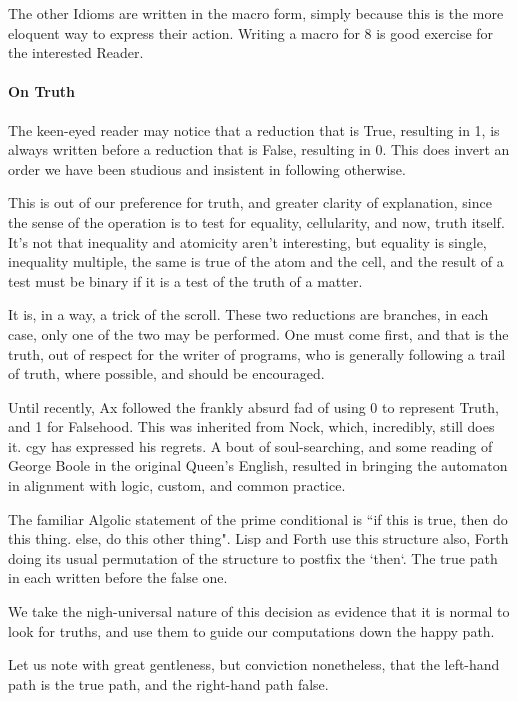 \documentclass[twoside]{article}
\begin{document}
The other Idioms are written in the macro form, simply because this is the more eloquent way to express their action. Writing a macro for 8 is good exercise for the interested Reader.

\paragraph{On Truth}

The keen-eyed reader may notice that a reduction that is True, resulting in 1, is always written before a reduction that is False, resulting in 0. This does invert an order we have been studious and insistent in following otherwise.

This is out of our preference for truth, and greater clarity of explanation,  since the sense of the operation is to test for equality, cellularity, and now, truth itself. It's not that inequality and atomicity aren't interesting, but equality is single, inequality multiple, the same is true of the atom and the cell, and the result of a test must be binary if it is a test of the truth of a matter.

It is, in a way, a trick of the scroll. These two reductions are branches, in each case, only one of the two may be performed. One must come first, and that is the truth, out of respect for the writer of programs, who is generally following a trail of truth, where possible, and should be encouraged.

Until recently, Ax followed the frankly absurd fad of using 0 to represent Truth, and 1 for Falsehood. This was inherited from Nock, which, incredibly, still does it. cgy has expressed his regrets. A bout of soul-searching, and some reading of George Boole in the original Queen's English, resulted in bringing the automaton in alignment with logic, custom, and common practice.

The familiar Algolic statement of the prime conditional is ``if this is true, then do this thing. else, do this other thing". Lisp and Forth use this structure also, Forth doing its usual permutation of the structure to postfix the `then`. The true path in each written before the false one.

We take the nigh-universal nature of this decision as evidence that it is normal to look for truths, and use them to guide our computations down the happy path.

Let us note with great gentleness, but conviction nonetheless, that the left-hand path is the true path, and the right-hand path false.
\end{document}
